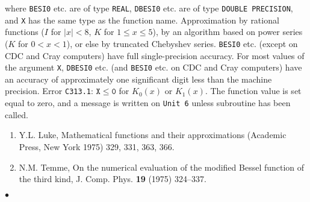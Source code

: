 where {\tt BESI0} etc. are of type {\tt REAL}, {\tt DBESI0} etc.
are of type {\tt DOUBLE PRECISION}, and {\tt X} has the same type as
the function name.
\Method
Approximation by rational functions ($I$ for $|x|<8$, $K$ for
$1 \le x \le 5$), by an algorithm based on power series ($K$ for
$0 < x < 1$), or else by truncated Chebyshev series.
\Accuracy
{\tt BESI0} etc. (except on CDC and Cray computers)
have full single-precision accuracy.
For most values of the argument {\tt X}, {\tt DBESI0} etc.
(and {\tt BESI0} etc. on CDC and Cray computers) have an accuracy of
approximately one significant digit less than the machine precision.
\Errorh
Error {\tt C313.1}:  $\mathtt{X \leq 0}$ for $K_0(x) $ or $K_1(x)$.
The function value is set equal to zero, and a message is written on
{\tt Unit 6} unless subroutine  has been called.
\newpage
\Refer
\begin{enumerate}
\item Y.L. Luke, Mathematical functions and their
approximations (Academic Press, New York 1975) 329, 331, 363, 366.
\item N.M. Temme, On the numerical evaluation of the modified Bessel
function of the third kind, J. Comp. Phys. {\bf 19} (1975) 324--337.
\end{enumerate}
$\bullet$
